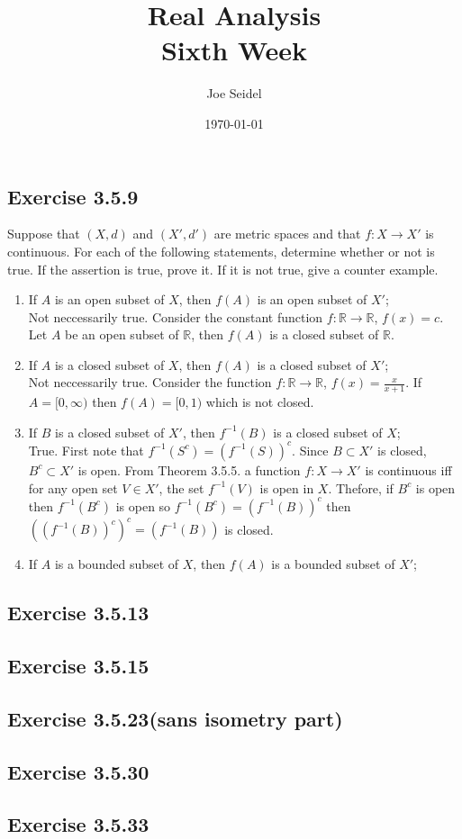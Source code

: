 \documentclass{tufte-book}
\title{Real Analysis\\Sixth Week }
\author{Joe Seidel}
\date{\today}
\theoremstyle{mytheoremstyle}
\theoremstyle{mylemstyle}
\theoremstyle{mydefstyle}
\begin{document}
\maketitle
{}
\newpage
{}

\subsection{Exercise 3.5.9}
Suppose that $(X,d)$ and $(X',d')$ are metric spaces and that $f: X \to X'$ is continuous.  For each of the following statements, determine whether or not is true.  If the assertion is true, prove it.  If it is not true, give a counter example.

\begin{enumerate}

\item If $A$ is an open subset of $X$, then $f(A)$ is an open subset of $X'$;\\
Not neccessarily true.  Consider the constant function $f: \mathbb{R} \to \mathbb{R}$, $f(x) = c$.  Let $A$ be an open subset of $\mathbb{R}$, then $f(A)$ is a closed subset of $\mathbb{R}$.

\item If $A$ is a closed subset of $X$, then $f(A)$ is a closed subset of $X'$;\\
Not neccessarily true.  Consider the function $f: \mathbb{R} \to \mathbb{R}$, $f(x) = \frac{x}{x+1}$.  If $A = [0, \infty)$ then $f(A) = [0,1)$ which is not closed.

\item If $B$ is a closed subset of $X'$, then $f^{-1}(B)$ is a closed subset of $X$;\\
True.  First note that $f^{-1}(S^c) = (f^{-1}(S))^c$.  Since $B \subset X'$ is closed, $B^c \subset X'$ is open.  From Theorem 3.5.5. a function $f: X \to X'$ is continuous iff for any open set $V \in X'$, the set $f^{-1}(V)$ is open in $X$.  Thefore, if $B^c$ is open then $f^{-1}(B^c)$ is open so $f^{-1}(B^c) = (f^{-1}(B))^c$ then $((f^{-1}(B))^c)^c = (f^{-1}(B))$ is closed.

\item If $A$ is a bounded subset of $X$, then $f(A)$ is a bounded subset of $X'$;


\end{enumerate}

\subsection{Exercise 3.5.13}

\subsection{Exercise 3.5.15}

\subsection{Exercise 3.5.23(sans isometry part)}

\subsection{Exercise 3.5.30}

\subsection{Exercise 3.5.33}
\end{document}

